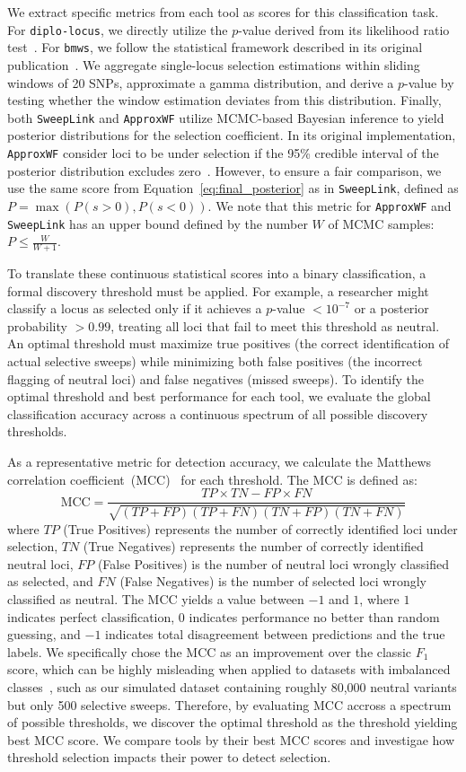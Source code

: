 \documentclass{article}
\newcommand{\SweepLink}{\texttt{SweepLink}\xspace}
\newcommand{\ApproxWF}{\texttt{ApproxWF}\xspace}
\newcommand{\diplolocus}{\texttt{diplo-locus}\xspace}
\newcommand{\bmws}{\texttt{bmws}\xspace}
\begin{document}
We extract specific metrics from each tool as scores for this classification task.
For \diplolocus, we directly utilize the $p$-value derived from its likelihood ratio test~\citep{cheng2025}. 
For \bmws, we follow the statistical framework described in its original publication~\citet{mathieson2022}.
We aggregate single-locus selection estimations within sliding windows of 20 SNPs, approximate a gamma distribution, and derive a $p$-value by testing whether the window estimation deviates from this distribution.
Finally, both \SweepLink and \ApproxWF utilize MCMC-based Bayesian inference to yield posterior distributions for the selection coefficient. 
In its original implementation, \ApproxWF consider loci to be under selection if the 95\% credible interval of the posterior distribution excludes zero~\citep{ferrer2016}. 
However, to ensure a fair comparison, we use the same score from Equation~\ref{eq:final_posterior} as in \SweepLink, defined as $P = \max(P(s > 0), P(s < 0))$.
We note that this metric for \ApproxWF and \SweepLink has an upper bound defined by the number $W$ of MCMC samples: $P \leq \frac{W}{W+1}$.

To translate these continuous statistical scores into a binary classification, a formal discovery threshold must be applied. 
For example, a researcher might classify a locus as selected only if it achieves a $p$-value $< 10^{-7}$ or a posterior probability $> 0.99$, treating all loci that fail to meet this threshold as neutral.
An optimal threshold must maximize true positives (the correct identification of actual selective sweeps) while minimizing both false positives (the incorrect flagging of neutral loci) and false negatives (missed sweeps).
To identify the optimal threshold and best performance for each tool, we evaluate the global classification accuracy across a continuous spectrum of all possible discovery thresholds. 

As a representative metric for detection accuracy, we calculate the Matthews correlation coefficient~(MCC)~\citep{matthews1975} for each threshold.
The MCC is defined as:
$$
\text{MCC} = \frac{TP \times TN - FP \times FN}{\sqrt{(TP + FP)(TP + FN)(TN + FP)(TN + FN)}}
$$
where $TP$ (True Positives) represents the number of correctly identified loci under selection, $TN$ (True Negatives) represents the number of correctly identified neutral loci, $FP$ (False Positives) is the number of neutral loci wrongly classified as selected, and $ FN $ (False Negatives) is the number of selected loci wrongly classified as neutral.
The MCC yields a value between $-1$ and $1$, where $1$ indicates perfect classification, $0$ indicates performance no better than random guessing, and $-1$ indicates total disagreement between predictions and the true labels. 
We specifically chose the MCC as an improvement over the classic $F_1$ score, which can be highly misleading when applied to datasets with imbalanced classes~\citep{chicco2020}, such as our simulated dataset containing roughly 80,000 neutral variants but only 500 selective sweeps.
Therefore, by evaluating MCC accross a spectrum of possible thresholds, we discover the optimal threshold as the threshold yielding best MCC score.
We compare tools by their best MCC scores and investigae how threshold selection impacts their power to detect selection.
\end{document}
